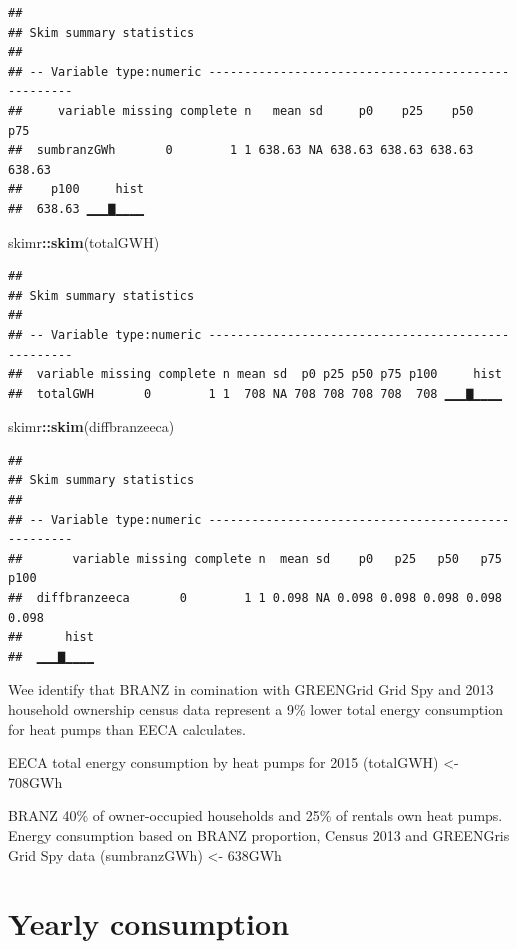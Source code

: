 \documentclass[]{article}
\newenvironment{Shaded}{\begin{snugshade}}{\end{snugshade}}
\newcommand{\KeywordTok}[1]{\textcolor[rgb]{0.13,0.29,0.53}{\textbf{#1}}}
\newcommand{\OperatorTok}[1]{\textcolor[rgb]{0.81,0.36,0.00}{\textbf{#1}}}
\newcommand{\NormalTok}[1]{#1}
\theoremstyle{definition}
\theoremstyle{definition}
\theoremstyle{definition}
\theoremstyle{remark}
\begin{document}
\begin{verbatim}
## 
## Skim summary statistics
## 
## -- Variable type:numeric ---------------------------------------------------
##     variable missing complete n   mean sd     p0    p25    p50    p75
##  sumbranzGWh       0        1 1 638.63 NA 638.63 638.63 638.63 638.63
##    p100     hist
##  638.63 ▁▁▁▇▁▁▁▁
\end{verbatim}

\begin{Shaded}
\begin{Highlighting}[]
\NormalTok{skimr}\OperatorTok{::}\KeywordTok{skim}\NormalTok{(totalGWH)}
\end{Highlighting}
\end{Shaded}

\begin{verbatim}
## 
## Skim summary statistics
## 
## -- Variable type:numeric ---------------------------------------------------
##  variable missing complete n mean sd  p0 p25 p50 p75 p100     hist
##  totalGWH       0        1 1  708 NA 708 708 708 708  708 ▁▁▁▇▁▁▁▁
\end{verbatim}

\begin{Shaded}
\begin{Highlighting}[]
\NormalTok{skimr}\OperatorTok{::}\KeywordTok{skim}\NormalTok{(diffbranzeeca)}
\end{Highlighting}
\end{Shaded}

\begin{verbatim}
## 
## Skim summary statistics
## 
## -- Variable type:numeric ---------------------------------------------------
##       variable missing complete n  mean sd    p0   p25   p50   p75  p100
##  diffbranzeeca       0        1 1 0.098 NA 0.098 0.098 0.098 0.098 0.098
##      hist
##  ▁▁▁▇▁▁▁▁
\end{verbatim}

Wee identify that BRANZ in comination with GREENGrid Grid Spy and 2013
household ownership census data represent a 9\% lower total energy
consumption for heat pumps than EECA calculates.

EECA total energy consumption by heat pumps for 2015 (totalGWH)
\textless{}- 708GWh

BRANZ 40\% of owner-occupied households and 25\% of rentals own heat
pumps. Energy consumption based on BRANZ proportion, Census 2013 and
GREENGris Grid Spy data (sumbranzGWh) \textless{}- 638GWh

\section{Yearly consumption}\label{yearly-consumption}
\end{document}

